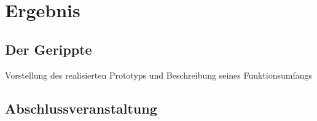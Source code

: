\chapter{Ergebnis} \label{summary}

\section{Der Gerippte} 
    Vorstellung des realisierten Prototyps und Beschreibung seines
    Funktionsumfangs

\section{Abschlussveranstaltung}
    